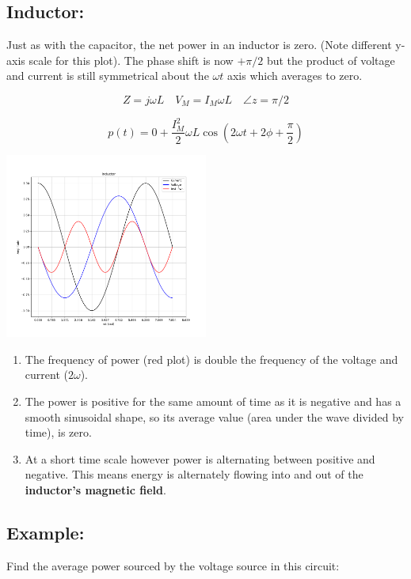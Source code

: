 \subsection*{Inductor:}

Just as with the capacitor, the net power in an inductor is zero. (Note
different y-axis scale for this plot).
The phase shift is now $+\pi/2$ but the product of voltage and current
is still symmetrical about the $\omega t$ axis which averages to zero.

\[
Z = j\omega L \quad V_M = I_M \omega L \quad \angle z = \pi/2
\]

\[
p(t) = 0 + \frac{I_M^2}{2} \omega L \cos(2\omega t + 2\phi + \frac{\pi}{2})
\]

\includegraphics[width=0.5\textwidth]{figsChapt03/LN19448.png}


\begin{enumerate}
    \item The frequency of power (red plot) is double the frequency of the voltage and current ($2\omega$).
    \item The power is positive for the same amount of time as it is
    negative and has a smooth sinusoidal shape, so its average value
    (area under the wave divided by time), is zero.
    \item At a short time scale however power is alternating between
    positive and negative.  This means energy is alternately flowing
    into and out of the {\bf inductor's magnetic field}.
\end{enumerate}




\subsection*{Example:}


Find the average power sourced by the voltage source in this circuit:


